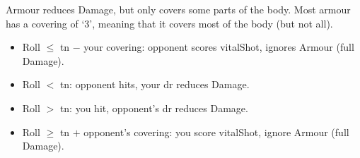 Armour reduces Damage, but only covers some parts of the body.
Most armour has a \gls{covering} of `3', meaning that it covers most of the body (but not all).

\begin{itemize}
  \item Roll $\leq$ \gls{tn} $-$ your \gls{covering}: opponent scores \gls{vitalShot}, ignores Armour (full Damage).
  \item Roll $<$ \gls{tn}: opponent hits, your \gls{dr} reduces Damage.
  \item Roll $>$ \gls{tn}: you hit, opponent's \gls{dr} reduces Damage.
  \item Roll $\geq$ \gls{tn} $+$ opponent's \gls{covering}: you score \gls{vitalShot}, ignore Armour (full Damage).
\end{itemize}
